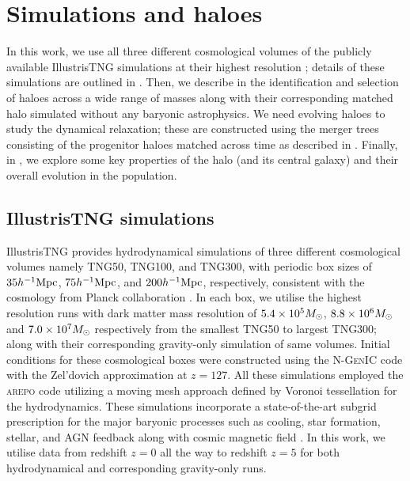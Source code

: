 \section{Simulations and haloes}
\label{sec:simhals}
In this work, we use all three different cosmological volumes of the publicly available IllustrisTNG simulations at their highest resolution \citep{2019ComAC...6....2N}; details of these simulations are outlined in . Then, we describe in  the identification and selection of haloes across a wide range of masses along with their corresponding matched halo simulated without any baryonic astrophysics. We need evolving haloes to study the dynamical relaxation; these are constructed using the merger trees consisting of the progenitor haloes matched across time as described in . Finally, in , %
we explore some key properties of the halo (and its central galaxy) and their overall evolution in the population. 

\subsection{IllustrisTNG simulations}
\label{sec:methods-itng}
IllustrisTNG provides hydrodynamical simulations of three different cosmological volumes namely TNG50, TNG100, and TNG300, with periodic box sizes of $35 h^{-1}{\rm Mpc}$, $75 h^{-1}{\rm Mpc}$, and $200 h^{-1}{\rm Mpc}$, respectively, consistent with the cosmology from Planck collaboration \citep[][]{2016A&A...594A..13P}. In each box, we utilise the highest resolution runs with dark matter mass resolution of $5.4 \times 10^5 M_{\odot}$, $8.8 \times 10^{6} M_{\odot}$ and $7.0 \times 10^7 M_{\odot}$ respectively from the smallest TNG50 to largest TNG300; along with their corresponding gravity-only simulation of same volumes. Initial conditions for these cosmological boxes were constructed using the \textsc{N-GenIC} code \citep[][]{2015ascl.soft02003S} with the Zel'dovich approximation \citep[][]{1970A&A.....5...84Z} at $z = 127$. All these simulations employed the \textsc{arepo} code \citep[][]{2020ApJS..248...32W} utilizing a moving mesh approach defined by Voronoi tessellation \citep[][]{2010MNRAS.401..791S} for the hydrodynamics. These simulations incorporate a state-of-the-art subgrid prescription for the major baryonic processes such as cooling, star formation, stellar, and AGN feedback along with cosmic magnetic field \citep[][]{2017MNRAS.465.3291W,2018MNRAS.473.4077P}. In this work, we utilise data from redshift $z=0$ all the way to redshift $z=5$ for both hydrodynamical and corresponding gravity-only runs.

